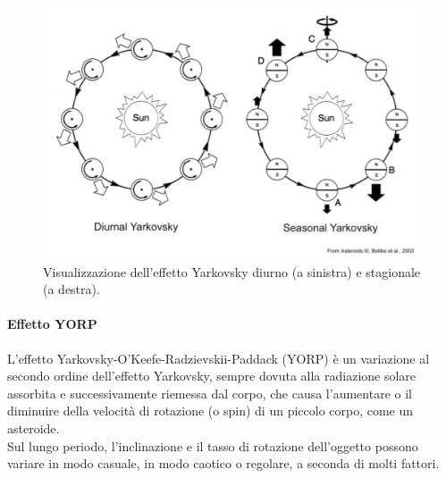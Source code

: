 \documentclass[a4paper,11pt,openright]{book}
\begin{document}
\begin{figure}[!h]
    \centering
    \includegraphics[scale=0.38]{figure/yark.jpg}
    \caption[Visualizzazione dell'effetto Yarkovsky diurno e stagionale.]{Visualizzazione dell'effetto Yarkovsky diurno (a sinistra) e stagionale (a destra). \citep{bottke_yarkovsky_2002}}
    \label{fig:yark}
\end{figure}

\paragraph*{Effetto YORP}
L’effetto Yarkovsky-O'Keefe-Radzievskii-Paddack (YORP) è un variazione al secondo ordine dell’effetto Yarkovsky, sempre dovuta alla radiazione solare assorbita e successivamente riemessa dal corpo, che causa l’aumentare o il diminuire della velocità di rotazione (o spin) di un piccolo corpo, come un asteroide.\\
Sul lungo periodo, l'inclinazione e il tasso di rotazione dell'oggetto possono variare in modo casuale, in modo caotico o regolare, a seconda di molti fattori.
\end{document}
